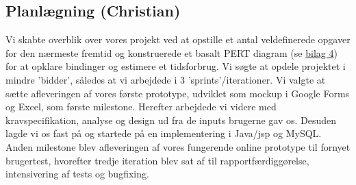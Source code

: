 \subsection*{Planlægning (Christian)}
Vi skabte overblik over vores projekt ved at opstille et antal veldefinerede
opgaver for den nærmeste fremtid og konstruerede et basalt PERT diagram
(se \hyperref[Bilag4]{bilag 4}) for at opklare bindinger og estimere et
tidsforbrug. Vi søgte at opdele projektet i mindre 'bidder', således at vi
arbejdede i 3 'sprints'/iterationer. Vi valgte at sætte afleveringen af vores
første prototype, udviklet som mockup i Google Forms og Excel, som første
milestone. Herefter arbejdede vi videre med kravspecifikation, analyse og design
ud fra de inputs brugerne gav os. Desuden lagde vi os fast på og startede på en
implementering i Java/jsp og MySQL. Anden milestone blev afleveringen af vores
fungerende online prototype til fornyet brugertest, hvorefter tredje iteration
blev sat af til rapportfærdiggørelse, intensivering af tests og bugfixing.